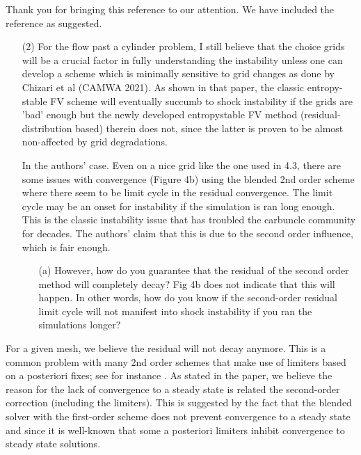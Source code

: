 \documentclass[english,11pt]{article}
\begin{document}
\noindent
Thank you for bringing this reference to our attention. We have included the reference as suggested. 

\bigskip
{\color{OliveGreen}
  \begin{itemize}
  \item[(2)]
    For the flow past a cylinder problem, I still believe that the choice grids will be a 
    crucial factor in fully understanding the instability unless one can develop a scheme 
    which is minimally sensitive to grid changes as done by Chizari et al (CAMWA 2021). 
    As shown in that paper, the classic entropy-stable FV scheme will eventually succumb to 
    shock instability if the grids are 'bad' enough but the newly developed entropystable 
    FV method (residual-distribution based) therein does not, since the latter is proven to be 
    almost non-affected by grid degradations. 

    In the authors' case. Even on a nice grid like the one used in 4.3, there are some 
    issues with convergence (Figure 4b) using the blended 2nd order scheme where there 
    seem to be limit cycle in the residual convergence. The limit cycle may be an onset 
    for instability if the simulation is ran long enough. This is the classic instability 
    issue that has troubled the carbuncle community for decades. The authors' claim
    that this is due to the second order influence, which is fair enough. 

    \begin{itemize}
    \item[(a)]
      However, how do you guarantee that the residual of the second order method will completely decay?
      Fig 4b does not indicate that this will happen. In other words, how do you know if the 
      second-order residual limit cycle will not manifest into shock instability if you ran the 
      simulations longer?      
    \end{itemize}
  \end{itemize}
}
\noindent
For a given mesh, we believe the residual will not decay anymore. 
This is a common problem with many 2nd order schemes that make use of limiters 
based on a posteriori fixes; see for instance \cite{kuzmin2020monolithic}. As stated in the 
paper, we believe the reason for the lack of convergence to a steady state is related the second-order 
correction (including the limiters). This is suggested by the fact that the blended solver with 
the first-order scheme does not prevent convergence to a steady state and since it is well-known that 
some a posteriori limiters inhibit convergence to steady state solutions.
\end{document}
